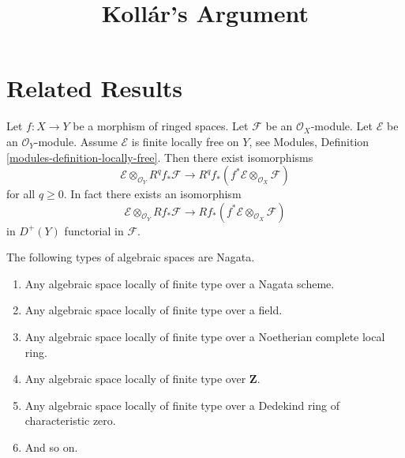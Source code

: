

\newcommand{\todo}[1]{\footnote{\textbf{TODO.} #1}}


\title{Koll\'ar's Argument}
\maketitle

\section{Related Results}

\begin{lemma}
\label{lemma-projection-formula}
Let $f : X \to Y$ be a morphism of ringed spaces.
Let $\mathcal{F}$ be an $\mathcal{O}_X$-module.
Let $\mathcal{E}$ be an $\mathcal{O}_Y$-module.
Assume $\mathcal{E}$ is finite locally free on $Y$, see
Modules, Definition \ref{modules-definition-locally-free}.
Then there exist isomorphisms
$$
\mathcal{E} \otimes_{\mathcal{O}_Y} R^qf_*\mathcal{F}
\longrightarrow
R^qf_*(f^*\mathcal{E} \otimes_{\mathcal{O}_X} \mathcal{F})
$$
for all $q \geq 0$. In fact there exists an isomorphism
$$
\mathcal{E} \otimes_{\mathcal{O}_Y} Rf_*\mathcal{F}
\longrightarrow
Rf_*(f^*\mathcal{E} \otimes_{\mathcal{O}_X} \mathcal{F})
$$
in $D^{+}(Y)$ functorial in $\mathcal{F}$.
\end{lemma}

\begin{lemma}
\label{lemma-ubiquity-nagata}
The following types of algebraic spaces are Nagata.
\begin{enumerate}
\item Any algebraic space locally of finite type over a Nagata scheme.
\item Any algebraic space locally of finite type over a field.
\item Any algebraic space locally of finite type over a
Noetherian complete local ring.
\item Any algebraic space locally of finite type over $\mathbf{Z}$.
\item Any algebraic space locally of finite type over a Dedekind ring of
characteristic zero.
\item And so on.
\end{enumerate}
\end{lemma}

